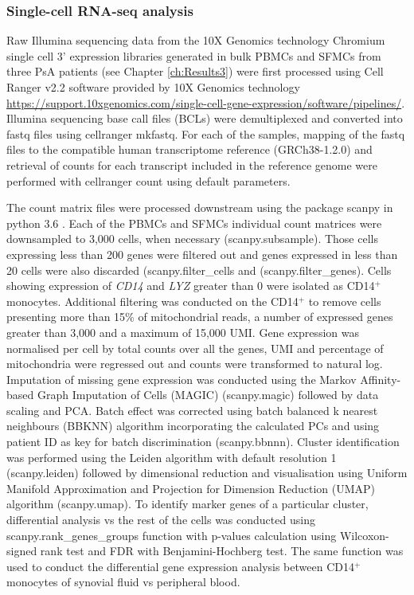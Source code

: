 \subsubsection{Single-cell RNA-seq analysis}

Raw Illumina sequencing data from the 10X Genomics technology Chromium single cell 3' expression libraries generated in bulk PBMCs and SFMCs from three PsA patients (see Chapter \ref{ch:Results3}) were first processed using Cell Ranger v2.2 software provided by 10X Genomics technology \url{https://support.10xgenomics.com/single-cell-gene-expression/software/pipelines/}. Illumina sequencing base call files (BCLs) were demultiplexed and converted into fastq files using cellranger mkfastq. For each of the samples, mapping of the fastq files to the compatible human transcriptome reference (GRCh38-1.2.0) and retrieval of counts for each transcript included in the reference genome were performed with cellranger count using default parameters. 

The count matrix files were processed downstream using the package scanpy in python 3.6 \parencite{Wolf2018}. Each of the PBMCs and SFMCs individual count matrices were downsampled to 3,000 cells, when necessary (scanpy.subsample). Those cells expressing less than 200 genes were filtered out and genes expressed in less than 20 cells were also discarded (scanpy.filter\_cells and (scanpy.filter\_genes). Cells showing expression of \textit{CD14} and \textit{LYZ} greater than 0 were isolated as CD14$^+$ monocytes. Additional filtering was conducted on the CD14$^+$ to remove cells presenting more than 15\% of mitochondrial reads, a number of expressed genes greater than 3,000 and a maximum of 15,000 UMI. Gene expression was normalised per cell by total counts over all the genes, UMI and percentage of mitochondria were regressed out and counts were transformed to natural log. Imputation of missing gene expression was conducted using the Markov Affinity-based Graph Imputation of Cells (MAGIC) (scanpy.magic) \parencite{Dijk2018} followed by data scaling and PCA. Batch effect was corrected using batch balanced k nearest neighbours (BBKNN) algorithm incorporating the calculated PCs and using patient ID as key for batch discrimination (scanpy.bbnnn). Cluster identification was performed using the Leiden algorithm with default resolution 1 (scanpy.leiden) \parencite{Traag2018} followed by dimensional reduction and visualisation using Uniform Manifold Approximation and Projection for Dimension Reduction (UMAP) algorithm (scanpy.umap). To identify marker genes of a particular cluster, differential analysis vs the rest of the cells was conducted using scanpy.rank\_genes\_groups function with p-values calculation using Wilcoxon-signed rank test and FDR with Benjamini-Hochberg test. The same function was used to conduct the differential gene expression analysis between CD14$^+$ monocytes of synovial fluid vs peripheral blood.


